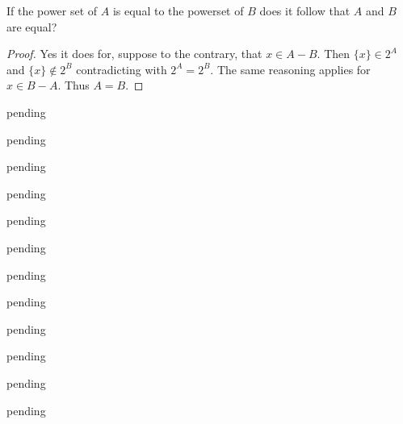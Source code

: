 \begin{exercise} \label{0.20}
	If the power set of $A$ is equal to the powerset of $B$ does it follow that $A$ and $B$ are equal?
	
	\begin{proof}
	    Yes it does for, suppose to the contrary, that $x \in A - B$. Then $\{ x \} \in 2^A$ and $\{x\}\not\in 2^B$ contradicting with $2^A=2^B$. The same reasoning applies for $x \in B - A$. Thus $A=B$.
	\end{proof}
\end{exercise}

\begin{exercise} \label{0.21}
	pending
\end{exercise}

\begin{exercise} \label{0.22}
	pending
\end{exercise}

\begin{exercise} \label{0.23}
	pending
\end{exercise}

\begin{exercise} \label{0.24}
	pending
\end{exercise}

\begin{exercise} \label{0.25}
	pending
\end{exercise}

\begin{exercise} \label{0.26}
	pending
\end{exercise}

\begin{exercise} \label{0.27}
	pending
\end{exercise}

\begin{exercise} \label{0.28}
	pending
\end{exercise}

\begin{exercise} \label{0.29}
	pending
\end{exercise}

\begin{exercise} \label{0.30}
	pending
\end{exercise}

\begin{exercise} \label{0.31}
	pending
\end{exercise}

\begin{exercise} \label{0.32}
	pending
\end{exercise}

